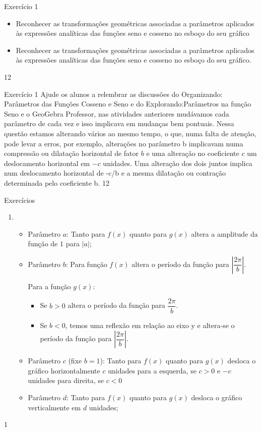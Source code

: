 \def\currentcolor{cor1}
\begin{objectives}{Exercício 1}
{
\begin{itemize}
\item Reconhecer as transformações geométricas associadas a parâmetros aplicados às expressões analíticas das funções seno e cosseno no esboço do seu gráfico
\end{itemize}

\begin{itemize}
\item Reconhecer as transformações geométricas associadas a
parâmetros aplicados às expressões analíticas das funções
seno e cosseno no esboço do seu gráfico.
\end{itemize}
}{1}{2}
\end{objectives}
\begin{sugestions}{Exercício 1}
{
Ajude os alunos a relembrar as discussões do Organizando: Parâmetros das Funções Cosseno e Seno e do Explorando:Parâmetros na função Seno e o GeoGebra
Professor, nas atividades anteriores mudávamos cada parâmetro de cada vez e isso implicava em mudanças bem pontuais. Nessa questão estamos alterando vários ao mesmo tempo, o que, numa falta de atenção, pode levar a erros, por exemplo, alterações no parâmetro b implicavam numa compressão ou dilatação horizontal de fator $b$ e uma alteração no coeficiente $c$ um deslocamento horizontal em $-c$ unidades. Uma alteração dos dois juntos implica num deslocamento horizontal de -c/b e a mesma dilatação ou contração determinada pelo coeficiente b.
}{1}{2}
\end{sugestions}
\begin{answer}{Exercícios}
{\exerciselist\small
\begin{enumerate}
\item 
\begin{itemize}
\item Parâmetro $a$: Tanto para $f(x)$ quanto para $g(x)$ altera a amplitude da função de $1$ para $|a|$;
\item Parâmetro $b$: Para função $f(x)$ altera o período da função para $|\dfrac{2\pi}{b}|$. 

Para a função $g(x)$:
\begin{itemize}
\item Se $b>0$ altera o período da função para $\dfrac{2\pi}{b}$. 
\item Se $b<0$, temos uma reflexão em relação ao eixo y e altera-se o período da função para $|\dfrac{2\pi}{b}|$.
\end{itemize}
\item Parâmetro $c$ (fixe $b=1$): Tanto para $f(x)$ quanto para $g(x)$ desloca o gráfico horizontalmente $c$ unidades para a esquerda, se $c>0$ e $-c$ unidades para direita, se $c<0$
\item Parâmetro $d$: Tanto para $f(x)$ quanto para $g(x)$ desloca o
gráfico verticalmente em $d$ unidades;
\end{itemize}
\end{enumerate}
}{1}
\end{answer}

